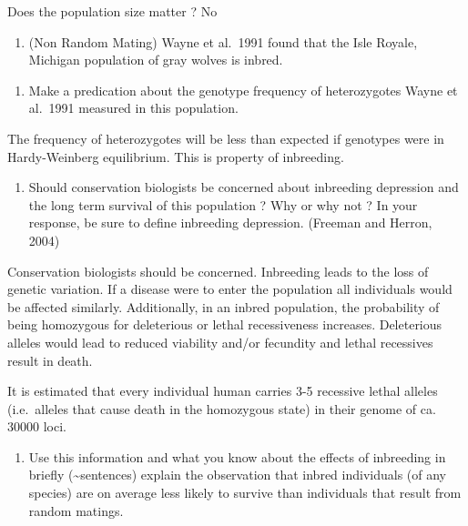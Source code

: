 \documentclass[nofonts,]{tufte-handout}
\providecommand{\tightlist}{%
  \setlength{\itemsep}{0pt}\setlength{\parskip}{0pt}}
\begin{document}
Does the population size matter ? No

\begin{enumerate}
\def\labelenumi{\arabic{enumi}.}
\setcounter{enumi}{6}
\tightlist
\item
  (Non Random Mating) Wayne et al.~1991 found that the Isle Royale,
  Michigan population of gray wolves is inbred.
\end{enumerate}

\begin{enumerate}
\def\labelenumi{\alph{enumi}.}
\tightlist
\item
  Make a predication about the genotype frequency of heterozygotes Wayne
  et al.~1991 measured in this population.
\end{enumerate}

The frequency of heterozygotes will be less than expected if genotypes
were in Hardy-Weinberg equilibrium. This is property of inbreeding.

\begin{enumerate}
\def\labelenumi{\alph{enumi}.}
\setcounter{enumi}{1}
\tightlist
\item
  Should conservation biologists be concerned about inbreeding
  depression and the long term survival of this population ? Why or why
  not ? In your response, be sure to define inbreeding depression.
  (Freeman and Herron, 2004)
\end{enumerate}

Conservation biologists should be concerned. Inbreeding leads to the
loss of genetic variation. If a disease were to enter the population all
individuals would be affected similarly. Additionally, in an inbred
population, the probability of being homozygous for deleterious or
lethal recessiveness increases. Deleterious alleles would lead to
reduced viability and/or fecundity and lethal recessives result in
death.

It is estimated that every individual human carries 3-5 recessive lethal
alleles (i.e.~alleles that cause death in the homozygous state) in their
genome of ca. 30000 loci.

\begin{enumerate}
\def\labelenumi{\alph{enumi}.}
\tightlist
\item
  Use this information and what you know about the effects of inbreeding
  in briefly (\textasciitilde sentences) explain the observation that
  inbred individuals (of any species) are on average less likely to
  survive than individuals that result from random matings.
\end{enumerate}
\end{document}
